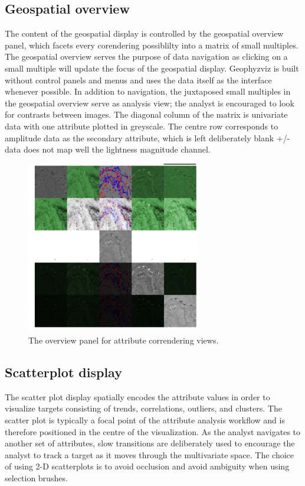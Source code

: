 \documentclass[journal]{vgtc}                %
\begin{document}
\subsection{Geospatial overview}
The content of the geospatial display is controlled by the geospatial overview panel, which facets every corendering
possiblilty into a matrix of small multiples. The geospatial overview serves the purpose of data navigation 
as clicking on a small multiple will update the focus of the geospatial display. Geophyzviz is built without 
control panels and menus and uses the data itself as the interface whenever possible. In addition to navigation,
the juxtaposed small multiples in the geospatial overview serve as analysis view; the analyst is encouraged to
look for contrasts between images. The diagonal column of the matrix is univariate data with one attribute
plotted in greyscale. The centre row corresponds to amplitude data as the secondary attribute, which is left
deliberately blank +/- data does not map well the lightness magnitude channel.

\begin{figure}[htb]
\centering
\includegraphics[width=3in]{corender_overview}
\caption{The overview panel for attribute correndering views.}
\label{overview_space}
\end{figure}

\subsection{Scatterplot display}
The scatter plot display spatially encodes the attribute values in order to visualize targets
consisting of trends, correlations, outliers, and clusters. The scatter plot is typically a focal
point of the attribute analysis workflow and is therefore positioned in the centre of the visualization.
As the analyst navigates to another set of attributes, slow transitions are deliberately used to encourage
the analyst to track a target as it moves through the multivariate space. The choice of using 2-D scatterplots
is to avoid occlusion and avoid ambiguity when using selection brushes. 
\end{document}
